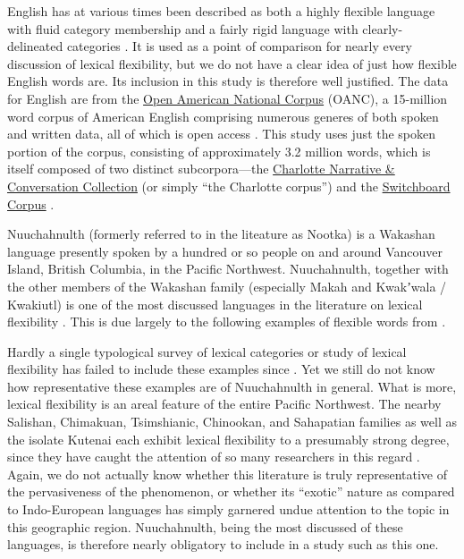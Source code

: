 English has at various times been described as both a highly flexible language with fluid category membership  and a fairly rigid language with clearly-delineated categories . It is used as a point of comparison for nearly every discussion of lexical flexibility, but we do not have a clear idea of just how flexible English words are. Its inclusion in this study is therefore well justified. The data for English are from the \href{http://www.anc.org/}{Open American National Corpus} (OANC), a 15-million word corpus of American English comprising numerous generes of both spoken and written data, all of which is open access . This study uses just the spoken portion of the corpus, consisting of approximately 3.2 million words, which is itself composed of two distinct subcorpora—the \href{https://newsouthvoices.uncc.edu}{Charlotte Narrative \& Conversation Collection} (or simply \enquote{the Charlotte corpus})  and the \href{https://catalog.ldc.upenn.edu/LDC97S62}{Switchboard Corpus} .

Nuuchahnulth (formerly referred to in the liteature as Nootka) is a Wakashan language presently spoken by a hundred or so people on and around Vancouver Island, British Columbia, in the Pacific Northwest. Nuuchahnulth, together with the other members of the Wakashan family (especially Makah and Kwakʼwala / Kwakiutl) is one of the most discussed languages in the literature on lexical flexibility . This is due largely to the following examples of flexible words from .


Hardly a single typological survey of lexical categories or study of lexical flexibility has failed to include these examples since . Yet we still do not know how representative these examples are of Nuuchahnulth in general. What is more, lexical flexibility is an areal feature of the entire Pacific Northwest. The nearby Salishan, Chimakuan, Tsimshianic, Chinookan, and Sahapatian families as well as the isolate Kutenai each exhibit lexical flexibility to a presumably strong degree, since they have caught the attention of so many researchers in this regard . Again, we do not actually know whether this literature is truly representative of the pervasiveness of the phenomenon, or whether its \enquote{exotic} nature as compared to Indo-European languages has simply garnered undue attention to the topic in this geographic region. Nuuchahnulth, being the most discussed of these languages, is therefore nearly obligatory to include in a study such as this one.

